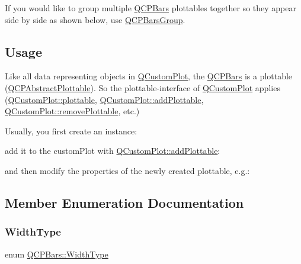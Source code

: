 If you would like to group multiple \mbox{\hyperlink{class_q_c_p_bars}{Q\+C\+P\+Bars}} plottables together so they appear side by side as shown below, use \mbox{\hyperlink{class_q_c_p_bars_group}{Q\+C\+P\+Bars\+Group}}.

\hypertarget{class_q_c_p_statistical_box_usage}{}\subsection{Usage}\label{class_q_c_p_statistical_box_usage}
Like all data representing objects in \mbox{\hyperlink{class_q_custom_plot}{Q\+Custom\+Plot}}, the \mbox{\hyperlink{class_q_c_p_bars}{Q\+C\+P\+Bars}} is a plottable (\mbox{\hyperlink{class_q_c_p_abstract_plottable}{Q\+C\+P\+Abstract\+Plottable}}). So the plottable-\/interface of \mbox{\hyperlink{class_q_custom_plot}{Q\+Custom\+Plot}} applies (\mbox{\hyperlink{class_q_custom_plot_a32de81ff53e263e785b83b52ecd99d6f}{Q\+Custom\+Plot\+::plottable}}, \mbox{\hyperlink{class_q_custom_plot_ab7ad9174f701f9c6f64e378df77927a6}{Q\+Custom\+Plot\+::add\+Plottable}}, \mbox{\hyperlink{class_q_custom_plot_af3dafd56884208474f311d6226513ab2}{Q\+Custom\+Plot\+::remove\+Plottable}}, etc.)

Usually, you first create an instance\+: 
\begin{DoxyCodeInclude}
\end{DoxyCodeInclude}
add it to the custom\+Plot with \mbox{\hyperlink{class_q_custom_plot_ab7ad9174f701f9c6f64e378df77927a6}{Q\+Custom\+Plot\+::add\+Plottable}}\+: 
\begin{DoxyCodeInclude}
\end{DoxyCodeInclude}
and then modify the properties of the newly created plottable, e.\+g.\+: 
\begin{DoxyCodeInclude}
\end{DoxyCodeInclude}


\subsection{Member Enumeration Documentation}
\mbox{\label{class_q_c_p_bars_a65dbbf1ab41cbe993d71521096ed4649}} 
\subsubsection{\texorpdfstring{Width\+Type}{WidthType}}
{\footnotesize\ttfamily enum \mbox{\hyperlink{class_q_c_p_bars_a65dbbf1ab41cbe993d71521096ed4649}{Q\+C\+P\+Bars\+::\+Width\+Type}}}

